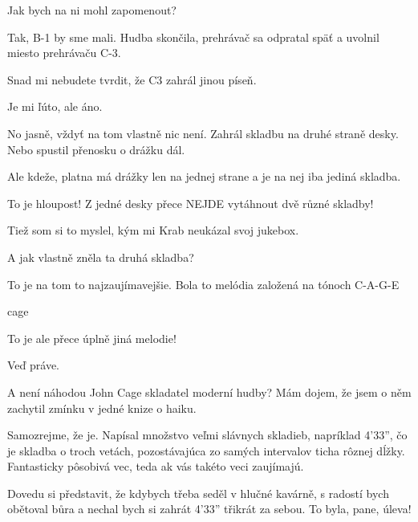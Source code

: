 \documentclass[12pt]{article}
\begin{document}
\begin{description}[itemsep=0pt]
\item[A:] Jak bych na ni mohl zapomenout?

\item[Ž:] Tak, B-1 by sme mali. Hudba skončila, prehrávač sa odpratal späť a 
    uvolnil miesto prehrávaču C-3.

\item[A:] Snad mi nebudete tvrdit, že C3 zahrál jinou píseň.

\item[Ž:] Je mi ľúto, ale áno.

\item[A:] No jasně, vždyť na tom vlastně nic není. Zahrál skladbu na druhé straně desky.
    Nebo spustil přenosku o drážku dál.

\item[Ž:] Ale kdeže, platna má drážky len na jednej strane a je na nej iba jediná skladba.

\item[A:] To je hloupost! Z jedné desky přece NEJDE vytáhnout dvě různé skladby!

\item[Ž:] Tiež som si to myslel, kým mi Krab neukázal svoj jukebox.

\item[A:] A jak vlastně zněla ta druhá skladba?

\item[Ž:] To je na tom to najzaujímavejšie. Bola to melódia založená na tónoch C-A-G-E

\item[melodia] cage

\item[A:] To je ale přece úplně jiná melodie!

\item[Ž:] Veď práve.

\item[A:] A není náhodou John Cage skladatel moderní hudby? Mám dojem, že jsem o něm
    zachytil zmínku v jedné knize o haiku.

\item[Ž:] Samozrejme, že je. Napísal množstvo veľmi slávnych skladieb, napríklad 4'33'', 
    čo je skladba o troch vetách, pozostávajúca zo samých intervalov ticha rôznej dĺžky. 
    Fantasticky pôsobivá vec, teda ak vás takéto veci zaujímajú.

\item[A:] Dovedu si představit, že kdybych třeba seděl v hlučné kavárně, s radostí
    bych obětoval bůra a nechal bych si zahrát 4'33'' třikrát za sebou. To byla, pane, úleva!


\end{description}
\end{document}

